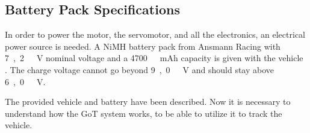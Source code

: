 \subsection{Battery Pack Specifications} \label{sssec:BatterySpecs}
In order to power the motor, the servomotor, and all the electronics, an electrical power source is needed. A NiMH battery pack from Ansmann Racing with \si{7,2\ V} nominal voltage and a \si{4700\ mAh} capacity is given with the vehicle \cite{BatteryDS}. The charge voltage cannot go beyond \si{9,0\ V} and should stay above \si{6,0\ V}.

The provided vehicle and battery have been described. Now it is necessary to understand how the GoT system works, to be able to utilize it to track the vehicle.
